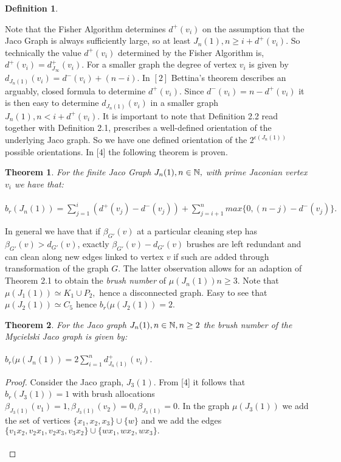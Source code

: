 \documentclass[11pt]{article}
\numberwithin{equation}{section}
\newtheorem{theorem}{Theorem}[section]
\newtheorem{definition}{Definition}[section]
\begin{document}
{\begin{definition}
\end{definition}
\noindent  Note that the Fisher Algorithm determines $d^+(v_i)$ on the assumption that the Jaco Graph is always sufficiently large, so at least $J_n(1), n \geq i+ d^+(v_i).$ So technically the value $d^+(v_i)$ determined by the Fisher Algorithm is, $d^+(v_i) = d_{J_{\infty}}^+(v_i).$ For a smaller graph the degree of vertex $v_i$ is given by $d_{J_n(1)}(v_i) = d^-(v_i) + (n-i).$ In $[2]$ Bettina's theorem describes an arguably, closed formula to determine $d^+(v_i)$. Since $d^-(v_i) = n - d^+(v_i)$ it is then easy to determine $d_{J_n(1)}(v_i)$ in a smaller graph $J_n(1), n< i + d^+(v_i).$ It is important to note that Definition 2.2 read together with Definition 2.1, prescribes a well-defined orientation of the underlying Jaco graph. So we have one defined orientation of the $2^{\epsilon(J_n(1))}$ possible orientations. In [4] the following theorem is proven.
\begin{theorem}
For the finite Jaco Graph $J_n(1), n \in \Bbb N,$ with prime Jaconian vertex $v_i$ we have that:\\ \\
$b_r(J_n(1)) = \sum\limits_{j=1}^{i}(d^+(v_j) - d^-(v_j)) + \sum\limits_{j = i+1}^{n}max\{0, (n-j)- d^-(v_j)\}.$
\end{theorem}
\noindent In general we have that if $\beta_{G'}(v)$ at a particular cleaning step has $\beta_{G'}(v) > d_{G'}(v)$, exactly $\beta_{G'}(v) - d_{G'}(v)$ brushes are left redundant and can clean along new edges linked to vertex $v$ if such are added through transformation of the graph $G$. The latter observation allows for an adaption of Theorem 2.1 to obtain the \emph{brush number} of $\mu(J_n(1)) n \geq 3$. Note that $\mu(J_1(1)) \simeq K_1 \cup P_2,$ hence a disconnected graph. Easy to see that $\mu(J_2(1)) \simeq C_5$ hence $b_r(\mu(J_2(1)) = 2.$
\begin{theorem}
For the Jaco graph $J_n(1), n \in \Bbb N, n \geq 2$ the brush number of the Mycielski Jaco graph is given by:\\ \\
$b_r(\mu(J_n(1)) = 2\sum\limits_{i=1}^{n}d^+_{J_n(1)}(v_i).$
\end{theorem}
\begin{proof}
Consider the Jaco graph, $J_3(1)$. From [4] it follows that $b_r(J_3(1)) =1$ with brush allocations $\beta_{J_3(1)}(v_1) =1, \beta_{J_3(1)}(v_2) = 0, \beta_{J_3(1)} = 0.$ In the graph $\mu(J_3(1))$ we add the set of vertices $\{x_1, x_2, x_3\} \cup \{w\}$ and we add the edges $\{v_1x_2, v_2x_1, v_2x_3, v_3x_2\} \cup \{wx_1, wx_2, wx_3\}.$\\ \\

\end{proof}}
\end{document}
